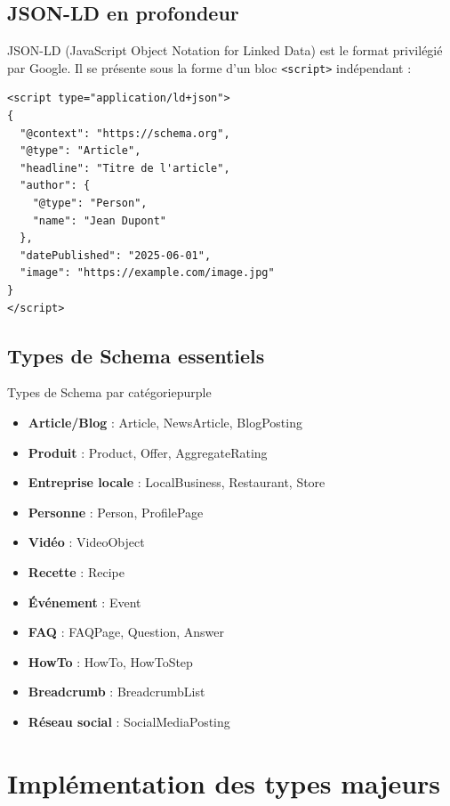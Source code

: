 \documentclass[12pt,a4paper,twoside]{report}
\begin{document}
\subsection{JSON-LD en profondeur}

JSON-LD (JavaScript Object Notation for Linked Data) est le format privilégié par Google. Il se présente sous la forme d'un bloc \texttt{<script>} indépendant :

\begin{lstlisting}[style=htmlcode,caption={Structure JSON-LD typique}]
<script type="application/ld+json">
{
  "@context": "https://schema.org",
  "@type": "Article",
  "headline": "Titre de l'article",
  "author": {
    "@type": "Person",
    "name": "Jean Dupont"
  },
  "datePublished": "2025-06-01",
  "image": "https://example.com/image.jpg"
}
</script>
\end{lstlisting}

\subsection{Types de Schema essentiels}

\begin{mybox}{Types de Schema par catégorie}{purple}
\begin{itemize}
    \item \textbf{Article/Blog} : Article, NewsArticle, BlogPosting
    \item \textbf{Produit} : Product, Offer, AggregateRating
    \item \textbf{Entreprise locale} : LocalBusiness, Restaurant, Store
    \item \textbf{Personne} : Person, ProfilePage
    \item \textbf{Vidéo} : VideoObject
    \item \textbf{Recette} : Recipe
    \item \textbf{Événement} : Event
    \item \textbf{FAQ} : FAQPage, Question, Answer
    \item \textbf{HowTo} : HowTo, HowToStep
    \item \textbf{Breadcrumb} : BreadcrumbList
    \item \textbf{Réseau social} : SocialMediaPosting
\end{itemize}
\end{mybox}

\section{Implémentation des types majeurs}
\end{document}
